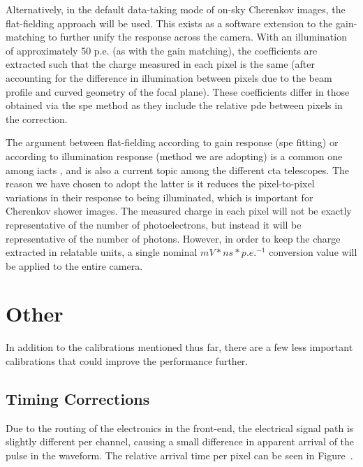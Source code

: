 Alternatively, in the default data-taking mode of on-sky Cherenkov images, the flat-fielding approach will be used. This exists as a software extension to the gain-matching to further unify the response across the camera. With an illumination of approximately 50 p.e. (as with the gain matching), the coefficients are extracted such that the charge measured in each pixel is the same (after accounting for the difference in illumination between pixels due to the beam profile and curved geometry of the focal plane). These coefficients differ in those obtained via the \gls{spe} method as they include the relative \gls{pde} between pixels in the correction. 

The argument between flat-fielding according to gain response (\gls{spe} fitting) or according to illumination response (method we are adopting) is a common one among \glspl{iact} , and is also a current topic among the different \gls{cta} telescopes. The reason we have chosen to adopt the latter is it reduces the pixel-to-pixel variations in their response to being illuminated, which is important for Cherenkov shower images. The measured charge in each pixel will not be exactly representative of the number of photoelectrons, but instead it will be representative of the number of photons. However, in order to keep the charge extracted in relatable units, a single nominal $mV*ns*p.e.^{-1}$ conversion value will be applied to the entire camera.


\section{Other}

In addition to the calibrations mentioned thus far, there are a few less important calibrations that could improve the performance further. 

\subsection{Timing Corrections}

Due to the routing of the electronics in the front-end, the electrical signal path is slightly different per channel, causing a small difference in apparent arrival of the pulse in the waveform. The relative arrival time per pixel can be seen in Figure~. 

